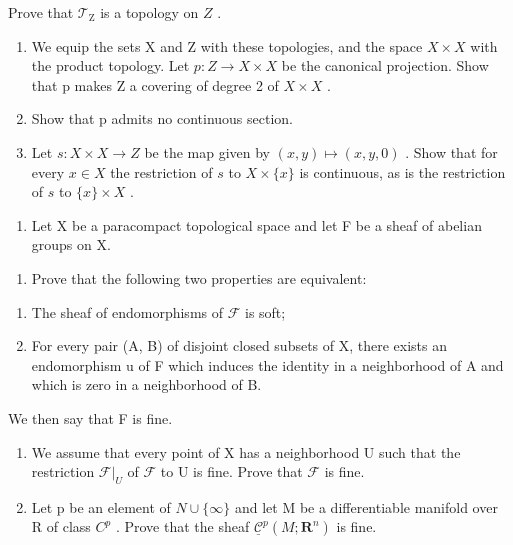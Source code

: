 Prove that \(\mathcal{T}_{\mathrm{Z}}\) is a topology on \(Z\) .

\begin{enumerate}
\def\labelenumi{\alph{enumi})}
\setcounter{enumi}{2}
\item
  We equip the sets X and Z with these topologies, and the space \(X \times X\) with the product topology. Let \(p: Z \to X \times X\) be the canonical projection. Show that p makes Z a covering of degree 2 of \(X \times X\) .
\item
  Show that p admits no continuous section.
\item
  Let \(s: X \times X \to Z\) be the map given by \((x, y) \mapsto (x, y, 0)\) . Show that for every \(x \in X\) the restriction of \(s\) to \(X \times \{x\}\) is continuous, as is the restriction of \(s\) to \(\{x\} \times X\) .
\end{enumerate}

\exercisegroup

\begin{enumerate}
\def\labelenumi{\arabic{enumi})}
\tightlist
\item
  Let X be a paracompact topological space and let F be a sheaf of abelian groups on X.
\end{enumerate}

\begin{enumerate}
\def\labelenumi{\alph{enumi})}
\tightlist
\item
  Prove that the following two properties are equivalent:
\end{enumerate}

\begin{enumerate}
\def\labelenumi{(\roman{enumi})}
\item
  The sheaf of endomorphisms of \(\mathcal{F}\) is soft;
\item
  For every pair (A, B) of disjoint closed subsets of X, there exists an endomorphism u of F which induces the identity in a neighborhood of A and which is zero in a neighborhood of B.
\end{enumerate}

We then say that F is fine.

\begin{enumerate}
\def\labelenumi{\alph{enumi})}
\setcounter{enumi}{1}
\item
  We assume that every point of X has a neighborhood U such that the restriction \(\mathcal{F}|_{U}\) of \(\mathcal{F}\) to U is fine. Prove that \(\mathcal{F}\) is fine.
\item
  Let p be an element of \(N \cup \{\infty\}\) and let M be a differentiable manifold over R of class \(C^{p}\) . Prove that the sheaf \(\underline{\mathcal{C}}^{p}(M; \mathbf{R}^{n})\) is fine.
\end{enumerate}

